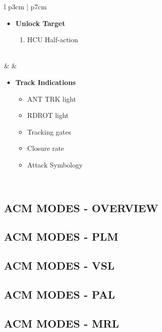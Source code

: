 \documentclass[8pt,usenames,dvipsnames,twoside]{article}
\begin{document}
\begin{center}
\begin{longtable}{l p{3cm} | p{7cm}}
\begin{minipage}[t]{\linewidth}
\begin{itemize}
						\item \textbf{Unlock Target}
						\begin{enumerate}[label=(\alph*), resume]
							\item HCU Half-action
						\end{enumerate}
					\end{itemize}
				\end{minipage} \\
				\midrule
				\textbullet &  & 
				\begin{minipage}[t]{\linewidth}
					\vspace{-7pt}
					\begin{itemize}
						\item \textbf{Track Indications}
						\begin{itemize}
							\item ANT TRK light
							\item RDROT light
							\item Tracking gates
							\item Closure rate 
							\item Attack Symbology
						\end{itemize}
					\end{itemize}
				\end{minipage} \\
				\bottomrule
			\end{longtable}
		\end{center}
	
		\subsection{ACM MODES - OVERVIEW}
		\subsection{ACM MODES - PLM}
		\subsection{ACM MODES - VSL}
		\subsection{ACM MODES - PAL}
		\subsection{ACM MODES - MRL}
		
		
		\cleardoublepage
		
\end{document}
